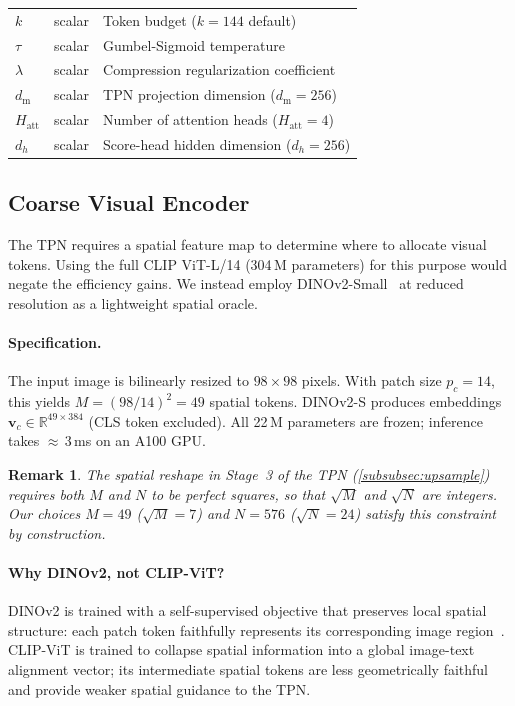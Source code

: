 \documentclass[11pt,a4paper]{article}
\newcommand{\R}{\mathbb{R}}
\newcommand{\vv}{\mathbf{v}}
\newtheorem{remark}{Remark}
\begin{document}
\begin{table}[t]
\begin{tabular}{@{}llp{7cm}@{}}
  $k$                  & scalar & Token budget ($k{=}144$ default) \\
  $\tau$               & scalar & Gumbel-Sigmoid temperature \\
  $\lambda$            & scalar & Compression regularization coefficient \\
  $d_{\mathrm{m}}$     & scalar & TPN projection dimension ($d_{\mathrm{m}}{=}256$) \\
  $H_{\mathrm{att}}$   & scalar & Number of attention heads ($H_{\mathrm{att}}{=}4$) \\
  $d_h$                & scalar & Score-head hidden dimension ($d_h{=}256$) \\
  \bottomrule
\end{tabular}
\end{table}

\subsection{Coarse Visual Encoder}
\label{subsec:coarse_enc}

The TPN requires a spatial feature map to determine where to allocate visual
tokens. Using the full CLIP ViT-L/14 (304\,M parameters) for this purpose would
negate the efficiency gains. We instead employ DINOv2-Small~\citep{oquab2023dinov2}
at reduced resolution as a lightweight spatial oracle.

\paragraph{Specification.} The input image is bilinearly resized to $98{\times}98$
pixels. With patch size $p_c{=}14$, this yields $M=(98/14)^2=49$ spatial tokens.
DINOv2-S produces embeddings $\vv_c\in\R^{49\times384}$ (CLS token excluded). All
22\,M parameters are frozen; inference takes ${\approx}\,3$\,ms on an A100 GPU.

\begin{remark}
  \label{rem:spatial_constraint}
  The spatial reshape in Stage~3 of the TPN (\cref{subsubsec:upsample}) requires
  both $M$ and $N$ to be perfect squares, so that $\sqrt{M}$ and $\sqrt{N}$ are
  integers. Our choices $M{=}49$ ($\sqrt{M}{=}7$) and $N{=}576$ ($\sqrt{N}{=}24$)
  satisfy this constraint by construction.
\end{remark}

\paragraph{Why DINOv2, not CLIP-ViT?} DINOv2 is trained with a self-supervised
objective that preserves local spatial structure: each patch token faithfully
represents its corresponding image region~\citep{oquab2023dinov2}. CLIP-ViT is
trained to collapse spatial information into a global image-text alignment vector;
its intermediate spatial tokens are less geometrically faithful and provide weaker
spatial guidance to the TPN.
\end{document}
